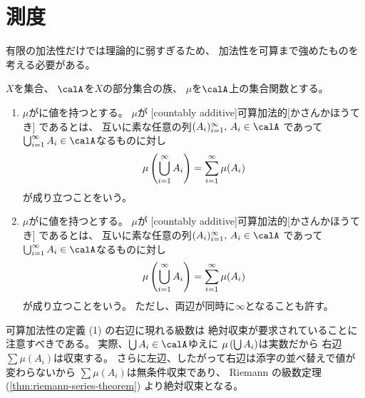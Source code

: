 \documentclass[report]{jlreq}
\begin{document}
\section{測度}

有限の加法性だけでは理論的に弱すぎるため、
加法性を可算まで強めたものを考える必要がある。

\begin{definition}[可算加法性]
    $X$を集合、
    $\calA$を$X$の部分集合の族、
    $\mu$を$\calA$上の集合関数とする。
    \begin{enumerate}
        \item $\mu$が\highlight{$(-\infty, +\infty)$}に値を持つとする。
            $\mu$が
            [countably additive]{可算加法的}[かさんかほうてき]
            であるとは、
            互いに素な任意の列$(A_i)_{i = 1}^\infty, \, A_i \in \calA$
            であって$\bigcup_{i = 1}^\infty A_i \in \calA$なるものに対し
            \begin{equation}
                \mu\left({\bigcup_{i = 1}^\infty A_i}\right)
                    = \sum_{i = 1}^\infty \mu(A_i)
            \end{equation}
            が成り立つことをいう。
        \item $\mu$が\highlight{$[0, +\infty]$}に値を持つとする。
            $\mu$が
            [countably additive]{可算加法的}[かさんかほうてき]
            であるとは、
            互いに素な任意の列$(A_i)_{i = 1}^\infty, \, A_i \in \calA$
            であって$\bigcup_{i = 1}^\infty A_i \in \calA$なるものに対し
            \begin{equation}
                \mu\left({\bigcup_{i = 1}^\infty A_i}\right)
                    = \sum_{i = 1}^\infty \mu(A_i)
            \end{equation}
            が成り立つことをいう。
            ただし、両辺が同時に$\infty$となることも許す。
    \end{enumerate}
\end{definition}

\begin{remark}
    可算加法性の定義 (1) の右辺に現れる級数は
    絶対収束が要求されていることに注意すべきである。
    実際、$\bigcup A_i \in \calA$ゆえに
    $\mu\left({\bigcup A_i}\right)$は実数だから
    右辺$\sum \mu(A_i)$は収束する。
    さらに左辺、したがって右辺は添字の並べ替えで値が変わらないから
    $\sum \mu(A_i)$は無条件収束であり、
    Riemann の級数定理
    (\cref{thm:riemann-series-theorem})
    より絶対収束となる。
\end{remark}
\end{document}
